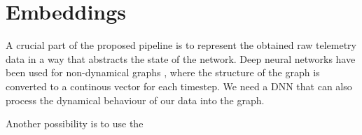 \newpage
\section{Embeddings}
\label{sec:embeddings}

A crucial part of the proposed pipeline is to represent the obtained raw telemetry data in a way that abstracts the state of the network.
Deep neural networks have been used for non-dynamical graphs \cite{venkatakrishnan_graph2seq_2018}, where the structure of the graph is converted to a continous vector for each timestep.
We need a DNN that can also process the dynamical behaviour of our data into the graph.

Another possibility is to use the 